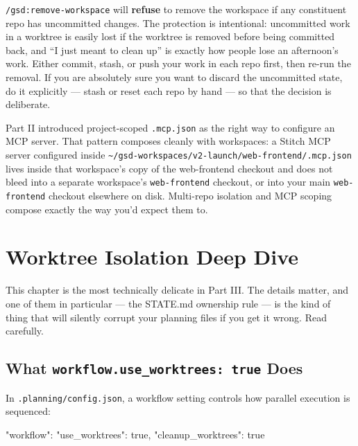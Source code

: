 \documentclass[11pt,letterpaper,openany]{book}
\begin{document}
\begin{gsdscenario}
\begin{gsdwarning}
\texttt{/gsd:remove-workspace} will \textbf{refuse} to remove the
workspace if any constituent repo has uncommitted changes. The
protection is intentional: uncommitted work in a worktree is
easily lost if the worktree is removed before being committed
back, and ``I just meant to clean up'' is exactly how people
lose an afternoon's work. Either commit, stash, or push your
work in each repo first, then re-run the removal. If you are
absolutely sure you want to discard the uncommitted state, do
it explicitly --- stash or reset each repo by hand --- so that
the decision is deliberate.
\end{gsdwarning}

\end{gsdscenario}

\begin{gsdnote}
Part II introduced project-scoped \texttt{.mcp.json} as the right
way to configure an MCP server. That pattern composes cleanly with
workspaces: a Stitch MCP server configured inside
\texttt{\~{}/gsd-workspaces/v2-launch/web-frontend/.mcp.json}
lives inside that workspace's copy of the web-frontend checkout
and does not bleed into a separate workspace's \texttt{web-frontend}
checkout, or into your main \texttt{web-frontend} checkout elsewhere
on disk. Multi-repo isolation and MCP scoping compose exactly the
way you'd expect them to.
\end{gsdnote}

\chapter{Worktree Isolation Deep Dive}

This chapter is the most technically delicate in Part III. The
details matter, and one of them in particular --- the STATE.md
ownership rule --- is the kind of thing that will silently corrupt
your planning files if you get it wrong. Read carefully.

\section{What \texttt{workflow.use\_worktrees: true} Does}

In \texttt{.planning/config.json}, a workflow setting controls how
parallel execution is sequenced:

\begin{gsdjson}
{
  "workflow": {
    "use_worktrees": true,
    "cleanup_worktrees": true
  }
}
\end{gsdjson}
\end{document}
